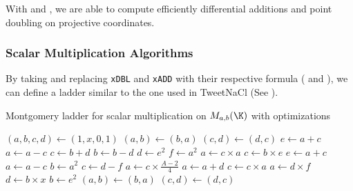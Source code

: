 With  and , we are able to compute efficiently
differential additions and point doubling on projective coordinates.

\subsubsection{Scalar Multiplication Algorithms}
\label{subsec:ECC-ladder}

By taking  and replacing \texttt{xDBL} and \texttt{xADD}
with their respective formula ( and ),
we can define a ladder similar to the one used in TweetNaCl (See ).

\begin{algorithm}
\caption{Montgomery ladder for scalar multiplication on $M_{a,b}(\K)$ with optimizations}
\label{alg:montgomery-double-add}
\begin{algorithmic}
\STATE $(a,b,c,d) \leftarrow (1,x,0,1)$
    \STATE $(a,b) \leftarrow (b,a)$
    \STATE $(c,d) \leftarrow (d,c)$
  \ENDIF
  \STATE $e \leftarrow a + c$
  \STATE $a \leftarrow a - c$
  \STATE $c \leftarrow b + d$
  \STATE $b \leftarrow b - d$
  \STATE $d \leftarrow e^2$
  \STATE $f \leftarrow a^2$
  \STATE $a \leftarrow c \times a$
  \STATE $c \leftarrow b \times e$
  \STATE $e \leftarrow a + c$
  \STATE $a \leftarrow a - c$
  \STATE $b \leftarrow a^2$
  \STATE $c \leftarrow d-f$
  \STATE $a \leftarrow c\times\frac{A - 2}{4}$
  \STATE $a \leftarrow a + d$
  \STATE $c \leftarrow c \times a$
  \STATE $a \leftarrow d \times f$
  \STATE $d \leftarrow b \times x$
  \STATE $b \leftarrow e^2$
    \STATE $(a,b) \leftarrow (b,a)$
    \STATE $(c,d) \leftarrow (d,c)$
  \ENDIF
\ENDFOR
\end{algorithmic}
\end{algorithm}

